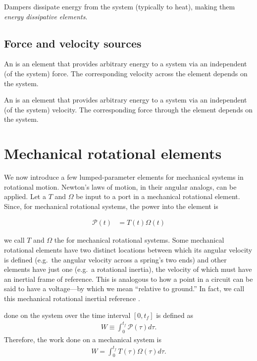 \documentclass[dynamic_systems.tex]{subfiles}
\begin{document}
Dampers dissipate energy from the system (typically to heat), making them \emph{energy dissipative elements}.
\tags{}

\subsection{Force and velocity sources}

An  is an element that provides arbitrary energy to a system via an independent (of the system) force.
The corresponding velocity across the element depends on the system.

An  is an element that provides arbitrary energy to a system via an independent (of the system) velocity.
The corresponding force through the element depends on the system.


\section{Mechanical rotational elements}
\tags{}

We now introduce a few lumped-parameter elements for mechanical systems in rotational motion.
Newton's laws of motion, in their angular analogs, can be applied.
Let a  $T$ and  $\Omega$ be input to a port in a mechanical rotational element.
Since, for mechanical rotational systems, the power into the element is 

\begin{align}
	\mathcal{P}(t) &= T(t) \Omega(t)
\end{align}

we call $T$ and $\Omega$ the  for mechanical rotational systems.
Some mechanical rotational elements have two distinct locations between which its angular velocity is defined (e.g.\ the angular velocity across a spring's two ends) and other elements have just one (e.g.\ a rotational inertia), the velocity of which must have an inertial frame of reference.
This is analogous to how a point in a circuit can be said to have a voltage---by which we mean ``relative to ground.''
In fact, we call this mechanical rotational inertial reference .

 done on the system over the time interval $[0,t_f]$ is defined as
\begin{align}
	W \equiv \int_0^{t_f} \mathcal{P}(\tau) d\tau.
\end{align}
Therefore, the work done on a mechanical system is 
\begin{align}
	W = \int_0^{t_f} T(\tau) \Omega(\tau) d\tau.
\end{align}
\end{document}
